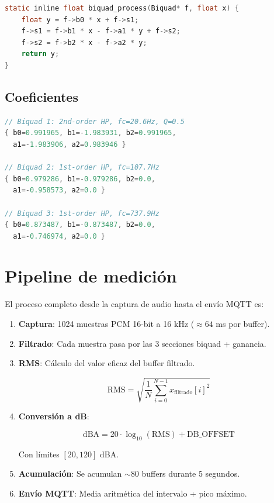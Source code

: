\documentclass[12pt,a4paper]{report}
\begin{document}
\begin{lstlisting}[language=C, caption={Procesado biquad (dsp.h)}]
static inline float biquad_process(Biquad* f, float x) {
    float y = f->b0 * x + f->s1;
    f->s1 = f->b1 * x - f->a1 * y + f->s2;
    f->s2 = f->b2 * x - f->a2 * y;
    return y;
}
\end{lstlisting}

\subsection{Coeficientes}

\begin{lstlisting}[language=C, caption={Coeficientes del filtro A-weighting para $f_s = 16000$ Hz}]
// Biquad 1: 2nd-order HP, fc=20.6Hz, Q=0.5
{ b0=0.991965, b1=-1.983931, b2=0.991965,
  a1=-1.983906, a2=0.983946 }

// Biquad 2: 1st-order HP, fc=107.7Hz
{ b0=0.979286, b1=-0.979286, b2=0.0,
  a1=-0.958573, a2=0.0 }

// Biquad 3: 1st-order HP, fc=737.9Hz
{ b0=0.873487, b1=-0.873487, b2=0.0,
  a1=-0.746974, a2=0.0 }
\end{lstlisting}

\section{Pipeline de medici\'on}

El proceso completo desde la captura de audio hasta el env\'io MQTT es:

\begin{enumerate}
    \item \textbf{Captura}: 1024 muestras PCM 16-bit a 16 kHz ($\approx 64$ ms por buffer).
    \item \textbf{Filtrado}: Cada muestra pasa por las 3 secciones biquad + ganancia.
    \item \textbf{RMS}: C\'alculo del valor eficaz del buffer filtrado.

    \begin{equation}
    \text{RMS} = \sqrt{\frac{1}{N} \sum_{i=0}^{N-1} x_{\text{filtrado}}[i]^2}
    \end{equation}

    \item \textbf{Conversi\'on a dB}:

    \begin{equation}
    \text{dBA} = 20 \cdot \log_{10}(\text{RMS}) + \text{DB\_OFFSET}
    \end{equation}

    Con l\'imites $[20, 120]$ dBA.

    \item \textbf{Acumulaci\'on}: Se acumulan $\sim$80 buffers durante 5 segundos.
    \item \textbf{Env\'io MQTT}: Media aritm\'etica del intervalo + pico m\'aximo.
\end{enumerate}
\end{document}
